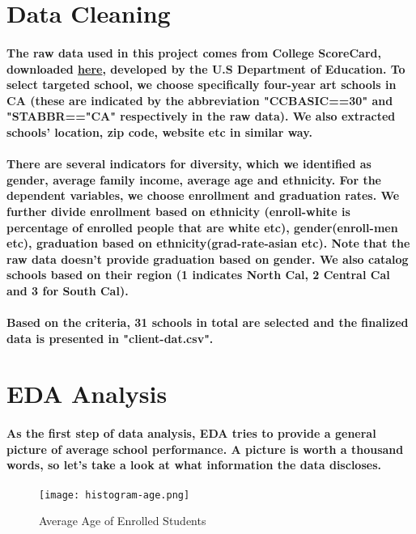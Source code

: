 \section{Data Cleaning}

\paragraph{The raw data used in this project comes from College ScoreCard, downloaded \href{https://ed-public-download.apps.cloud.gov/downloads/Most-Recent-Cohorts-All-Data-Elements.csv}{here}, developed by the U.S Department of Education. To select targeted school, we choose specifically four-year art schools in CA (these are indicated by the abbreviation "CCBASIC==30" and "STABBR=="CA" respectively in the raw data). We also extracted schools' location, zip code, website etc in similar way.}

\paragraph{ There are several indicators for diversity, which we identified as gender, average family income, average age and ethnicity. For the dependent variables, we choose enrollment and graduation rates. We further divide enrollment based on ethnicity (enroll-white is percentage of enrolled people that are white etc), gender(enroll-men etc), graduation based on ethnicity(grad-rate-asian etc). Note that the raw data doesn't provide graduation based on gender. We also catalog schools based on their region (1 indicates North Cal, 2 Central Cal and 3 for South Cal).} 
 \paragraph{Based on the criteria, 31 schools in total are selected and the finalized data is presented in "client-dat.csv".}


\section{EDA Analysis}
 \paragraph{ As the first step of data analysis, EDA tries to provide a general picture of average school performance. A picture is worth a thousand words, so let's take a look at what information the data discloses.}
  
 \begin{figure}
\centering
\texttt{[image: histogram-age.png]}
\caption{Average Age of Enrolled Students}
\end{figure}  
 

